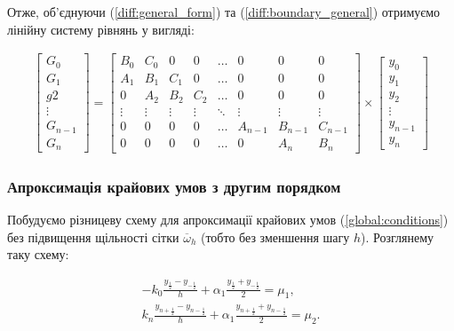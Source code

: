 Отже, об'єднуючи (\ref{diff:general_form}) та (\ref{diff:boundary_general}) отримуємо лінійну систему рівнянь у вигляді:

\begin{align} \label{linear_system}
\left[ \begin{array}{c} G_0 \\ G_1 \\ g2 \\ \vdots \\ G_{n-1} \\ G_n \end{array} \right] = 
\begin{bmatrix} 
B_0 & C_0 & 0 & 0 & \dots & 0 & 0 & 0\\ 
A_1 & B_1 & C_1 & 0 & \dots & 0 & 0 & 0\\ 
0 & A_2 & B_2 & C_2 & \dots & 0 & 0 & 0\\ 
\vdots & \vdots & \vdots & \vdots & \ddots & \vdots & \vdots & \vdots \\
0 & 0 & 0 & 0 & \dots & A_{n-1} & B_{n-1} & C_{n-1} \\
0 & 0 & 0 & 0 & \dots & 0 & A_n & B_n
\end{bmatrix} \times \left[ \begin{array}{c} y_0 \\ y_1 \\ y_2 \\ \vdots \\ y_{n-1} \\ y_n \end{array} \right]
\end{align}

\subsubsection{Апроксимація крайових умов з другим порядком}\label{approx:O(h^2)}

Побудуємо різницеву схему для апроксимації крайових умов (\ref{global:conditions}) без підвищення щільності сітки \(\overline{\omega}_h\) (тобто без зменшення шагу \(h\)). Розглянему таку схему:

\begin{equation}
\begin{multlined} \label{diff:boundary_extended}
-k_{0} \frac{y_{\frac{1}{2}} - y_{-\frac{1}{2}}}{h} + \alpha_1 \frac{y_{\frac{1}{2}} + y_{-\frac{1}{2}}}{2} = \mu_1, \\
k_{n} \frac{y_{n + \frac{1}{2}} - y_{n-\frac{1}{2}}}{h} + \alpha_1 \frac{y_{n+\frac{1}{2}} + y_{n-\frac{1}{2}}}{2} = \mu_2.
\end{multlined}
\end{equation}

